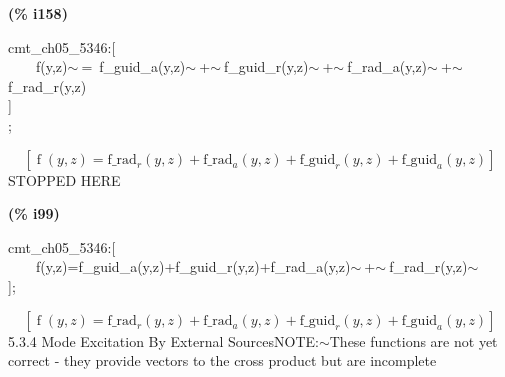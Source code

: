 \documentclass[fleqn]{article}
\begin{document}
\noindent
\begin{minipage}[t]{4.000000em}\color{red}\bfseries
(\% i158)	
\end{minipage}
\begin{minipage}[t]{\textwidth}\color{blue}
cmt\_ch05\_5346:[\\
\ \ \ \ f(y,z)\ensuremath{\sim\ }=\ f\_guid\_a(y,z)\ensuremath{\sim\ }+\ensuremath{\sim\ }f\_guid\_r(y,z)\ensuremath{\sim\ }+\ensuremath{\sim\ }f\_rad\_a(y,z)\ensuremath{\sim\ }+\ensuremath{\sim\ }f\_rad\_r(y,z)\\
]\\
;
\end{minipage}
\[\displaystyle \tag{\% o158} 
\left[ \operatorname{f}\left( y\operatorname{,}z\right) ={{\ensuremath{\mathrm{f\_ rad}}}_r}\left( y\operatorname{,}z\right) +{{\ensuremath{\mathrm{f\_ rad}}}_a}\left( y\operatorname{,}z\right) +{{\ensuremath{\mathrm{f\_ guid}}}_r}\left( y\operatorname{,}z\right) +{{\ensuremath{\mathrm{f\_ guid}}}_a}\left( y\operatorname{,}z\right) \right] \mbox{}
\]
STOPPED HERE


\noindent
\begin{minipage}[t]{4.000000em}\color{red}\bfseries
(\% i99)	
\end{minipage}
\begin{minipage}[t]{\textwidth}\color{blue}
cmt\_ch05\_5346:[\\
\ \ \ \ f(y,z)=f\_guid\_a(y,z)+f\_guid\_r(y,z)+f\_rad\_a(y,z)\ensuremath{\sim\ }+\ensuremath{\sim\ }f\_rad\_r(y,z)\ensuremath{\sim\ }\\
];
\end{minipage}
\[\displaystyle \tag{\% o99} 
\left[ \operatorname{f}\left( y\operatorname{,}z\right) ={{\ensuremath{\mathrm{f\_ rad}}}_r}\left( y\operatorname{,}z\right) +{{\ensuremath{\mathrm{f\_ rad}}}_a}\left( y\operatorname{,}z\right) +{{\ensuremath{\mathrm{f\_ guid}}}_r}\left( y\operatorname{,}z\right) +{{\ensuremath{\mathrm{f\_ guid}}}_a}\left( y\operatorname{,}z\right) \right] \mbox{}
\]
5.3.4   Mode Excitation By External SourcesNOTE:\ensuremath{\sim }These functions are not yet correct - they provide vectors to the cross product but are incomplete
\end{document}
